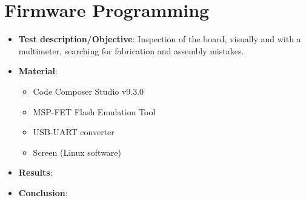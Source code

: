 

\section{Firmware Programming}

\begin{itemize}
    \item \textbf{Test description/Objective}: Inspection of the board, visually and with a multimeter, searching for fabrication and assembly mistakes.
    \item \textbf{Material}:
        \begin{itemize}
            \item Code Composer Studio v9.3.0
            \item MSP-FET Flash Emulation Tool
            \item USB-UART converter
            \item Screen (Linux software)
        \end{itemize}
    \item \textbf{Results}: %
    \item \textbf{Conclusion}: %
\end{itemize}


